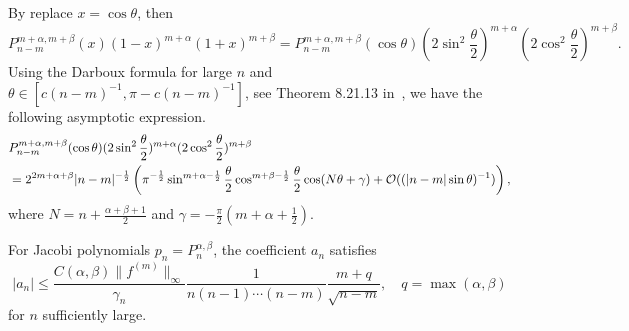 By replace $x = \cos\theta$, then 
\begin{equation}\nonumber
    P_{n-m}^{m+\alpha, m+\beta}(x) (1-x)^{m+\alpha}(1+x)^{m+\beta} = P_{n-m}^{m+\alpha, m+\beta}(\cos\theta) \left(2\sin^2 \frac{\theta}{2}\right)^{m+\alpha}\left(2\cos^2\frac{\theta}{2}\right)^{m+\beta}.
\end{equation}
Using the Darboux formula for large $n$ and $\theta\in [c (n-m)^{-1}, \pi - c(n-m)^{-1}]$, see Theorem 8.21.13 in~\cite{szeg1939orthogonal}, we have the following asymptotic expression.  
\begin{equation}\nonumber
\begin{aligned}
&P_{n-m}^{m+\alpha, m+\beta}(\cos\theta) (2\sin^2 \frac{\theta}{2})^{m+\alpha}(2\cos^2\frac{\theta}{2})^{m+\beta}\\
&=    2^{2m+\alpha+\beta}|n-m|^{-\frac{1}{2}}\left( \pi^{-\frac{1}{2}}\sin^{m+\alpha-\frac{1}{2}}\frac{\theta}{2} \cos^{m+\beta-\frac{1}{2}}\frac{\theta}{2} \cos(N\theta+\gamma) + \mathcal O((|n-m|\sin\theta)^{-1})\right), 
\end{aligned}
\end{equation}
where $N = n + \frac{\alpha+\beta+1}{2}$ and $\gamma = -\frac{\pi}{2}(m + \alpha + \frac{1}{2})$. 
\begin{theorem}
    For Jacobi polynomials $p_n = P_n^{\alpha, \beta}$, the coefficient $a_n$ satisfies 
    \begin{equation}
        |a_n| \le \frac{C(\alpha, \beta)\|f^{(m)}\|_{\infty}}{\gamma_n}  \frac{1}{n(n-1)\cdots (n-m)} \frac{m+q}{\sqrt{n-m}},\quad q=\max(\alpha,\beta)
    \end{equation}
    for $n$ sufficiently large.
\end{theorem}
